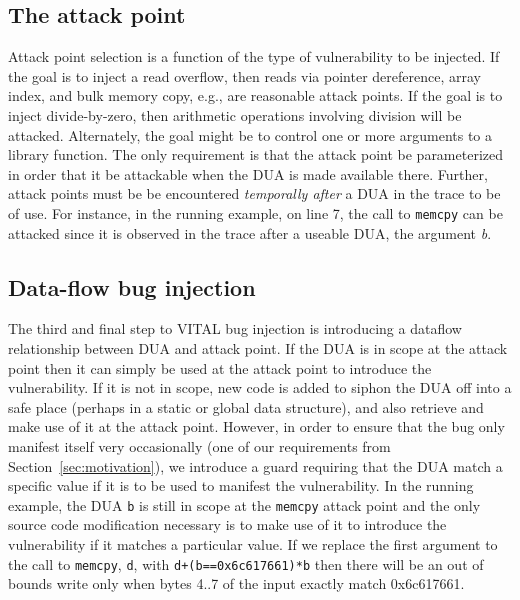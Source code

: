\subsection {The attack point}

Attack point selection is a function of the type of vulnerability to be injected.
If the goal is to inject a read overflow, then reads via pointer dereference, array index, and bulk memory copy, e.g., are reasonable attack points.  
If the goal is to inject divide-by-zero, then arithmetic operations involving division will be attacked. 
Alternately, the goal might be to control one or more arguments to a library function.
The only requirement is that the attack point be parameterized in order that it be attackable when the DUA is made available there. 
Further, attack points must be be encountered \emph{temporally after} a DUA in the trace to be of use. 
For instance, in the running example, on line 7, the call to \verb+memcpy+ can be attacked since it is observed in the trace after a useable DUA, the argument \emph{b}.


\subsection {Data-flow bug injection}

The third and final step to VITAL bug injection is introducing a dataflow relationship between DUA and attack point.  
If the DUA is in scope at the attack point then it can simply be used at the attack point to introduce the vulnerability.
If it is not in scope, new code is added to siphon the DUA off into a safe place (perhaps in a static or global data structure), and also retrieve and make use of it at the attack point. 
However, in order to ensure that the bug only manifest itself very occasionally (one of our requirements from Section~\ref{sec:motivation}), we introduce a guard requiring that the DUA match a specific value if it is to be used to manifest the vulnerability.
In the running example, the DUA \verb+b+ is still in scope at the \verb+memcpy+ attack point and the only source code modification necessary is to make use of it to introduce the vulnerability if it matches a particular value.  
If we replace the first argument to the call to \verb+memcpy+, \verb+d+, with \verb-d+(b==0x6c617661)*b- then there will be an out of bounds write only when bytes 4..7 of the input exactly match 0x6c617661. 










